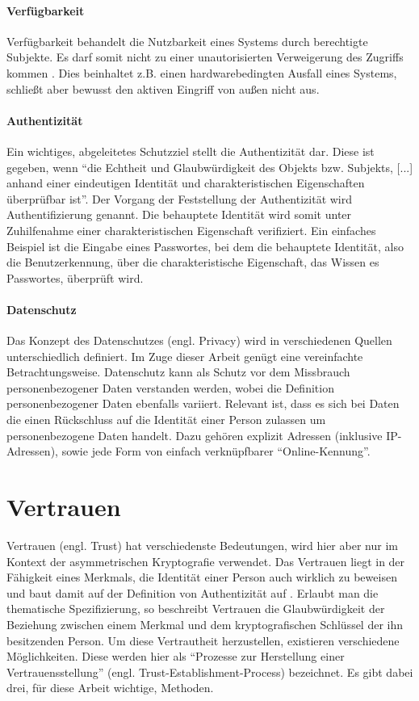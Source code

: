 \paragraph{Verfügbarkeit}
Verfügbarkeit behandelt die Nutzbarkeit eines Systems durch berechtigte Subjekte. Es darf somit nicht zu einer unautorisierten Verweigerung des Zugriffs kommen \cite[p. 12]{Eckert2013}. Dies beinhaltet z.B. einen hardwarebedingten Ausfall eines Systems, schließt aber bewusst den aktiven Eingriff von außen nicht aus.
 
\paragraph{Authentizität}
Ein wichtiges, abgeleitetes Schutzziel stellt die Authentizität dar. Diese ist gegeben, wenn \enquote{die Echtheit und Glaubwürdigkeit des Objekts bzw. Subjekts, [...] anhand einer eindeutigen Identität und charakteristischen Eigenschaften überprüfbar ist}\cite[p. 8]{Eckert2013}. Der Vorgang der Feststellung der Authentizität wird Authentifizierung genannt. Die behauptete Identität wird somit unter Zuhilfenahme einer charakteristischen Eigenschaft verifiziert. Ein einfaches Beispiel ist die Eingabe eines Passwortes, bei dem die behauptete Identität, also die Benutzerkennung, über die charakteristische Eigenschaft, das Wissen es Passwortes, überprüft wird.  

\paragraph{Datenschutz}
Das Konzept des Datenschutzes (engl. Privacy) wird in verschiedenen Quellen unterschiedlich definiert. Im Zuge dieser Arbeit genügt eine vereinfachte Betrachtungsweise. Datenschutz kann als Schutz vor dem Missbrauch personenbezogener Daten verstanden werden, wobei die Definition personenbezogener Daten ebenfalls variiert. Relevant ist, dass es sich bei Daten die einen Rückschluss auf die Identität einer Person zulassen um personenbezogene Daten handelt. Dazu gehören explizit Adressen (inklusive IP-Adressen), sowie jede Form von einfach verknüpfbarer ``Online-Kennung''\cite{Schwenke2018}.     

\section{Vertrauen}
\label{sec:trust}
Vertrauen (engl. Trust) hat verschiedenste Bedeutungen, wird hier aber nur im Kontext der asymmetrischen Kryptografie verwendet. Das Vertrauen liegt in der Fähigkeit eines Merkmals, die Identität einer Person auch wirklich zu beweisen und baut damit auf der Definition von Authentizität auf \cite{Perrin2010}. Erlaubt man die thematische Spezifizierung, so beschreibt Vertrauen die Glaubwürdigkeit der Beziehung zwischen einem Merkmal und dem kryptografischen Schlüssel der ihn besitzenden Person. Um diese Vertrautheit herzustellen, existieren verschiedene Möglichkeiten. Diese werden hier als ``Prozesse zur Herstellung einer Vertrauensstellung'' (engl. Trust-Establishment-Process) bezeichnet. Es gibt dabei drei, für diese Arbeit wichtige, Methoden.

